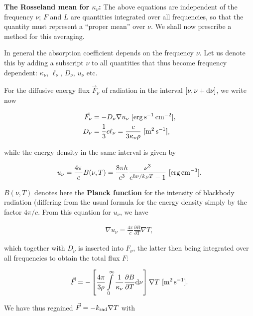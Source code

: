 \documentclass[a4paper,10pt]{article}
\begin{document}
{\noindent}\textbf{The Rosseland mean for $\kappa_\nu$:} The above equations are independent of the frequency $\nu$; $F$ and $L$ are quantities integrated over all frequencies, so that the quantity   must represent a ``proper mean'' over $\nu$. We shall now prescribe a method for this averaging.

{\noindent}In general the absorption coefficient depends on the frequency $\nu$. Let us denote this by adding a subscript $\nu$ to all quantities that thus become frequency dependent: $\kappa_\nu$, $\ell_\nu$, $D_\nu$, $u_\nu$ etc.

{\noindent}For the diffusive energy flux $\vec{F}_\nu$ of radiation in the interval $[\nu,\nu+{\rm d}\nu]$, we write now

\begin{align*}
    \vec{F}_\nu &= -D_\nu \nabla u_\nu ~ [{\rm erg\,s^{-1}\,cm^{-2}}], \\
    D_\nu &= \frac{1}{3}c\ell_\nu = \frac{c}{3\kappa_\nu\rho} ~ [{\rm m^2\,s^{-1}}],
\end{align*}

{\noindent}while the energy density in the same interval is given by

\begin{align*}
    u_\nu = \frac{4\pi}{c}B(\nu,T) = \frac{8\pi h}{c^3} \frac{\nu^3}{e^{h\nu/k_BT}-1}  ~ [{\rm erg\,cm^{-3}}].
\end{align*}

{\noindent}$B(\nu,T)$ denotes here the \textbf{Planck function} for the intensity of blackbody radiation (differing from the usual formula for the energy density simply by the factor $4\pi/c$. From this equation for $u_\nu$, we have

\begin{align*}
    \nabla u_\nu = \frac{4\pi}{c} \frac{\partial B}{\partial T}\nabla T,
\end{align*}

{\noindent}which together with $D_\nu$ is inserted into  $F_\nu$, the latter then being integrated over all frequencies to obtain the total flux $F$: 

\begin{align*}
    \vec{F} = -\left[ \frac{4\pi}{3\rho} \int\limits_0^\infty \frac{1}{\kappa_\nu} \frac{\partial B}{\partial T} {\rm d}\nu \right] \nabla T ~ [{\rm m^2\,s^{-1}}].
\end{align*}

{\noindent}We have thus regained $\vec{F}=-k_{\rm rad}\nabla T$ with
\end{document}
